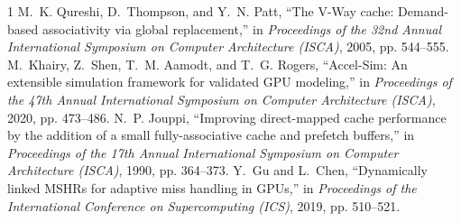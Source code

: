 \documentclass[conference,letterpaper]{IEEEtran}
\begin{document}
\begin{thebibliography}{1}
M.~K. Qureshi, D.~Thompson, and Y.~N. Patt, ``The {V-Way} cache: Demand-based associativity via global replacement,'' in \emph{Proceedings of the 32nd Annual International Symposium on Computer Architecture (ISCA)}, 2005, pp. 544--555.
M.~Khairy, Z.~Shen, T.~M. Aamodt, and T.~G. Rogers, ``{Accel-Sim}: An extensible simulation framework for validated {GPU} modeling,'' in \emph{Proceedings of the 47th Annual International Symposium on Computer Architecture (ISCA)}, 2020, pp. 473--486.
N.~P. Jouppi, ``Improving direct-mapped cache performance by the addition of a small fully-associative cache and prefetch buffers,'' in \emph{Proceedings of the 17th Annual International Symposium on Computer Architecture (ISCA)}, 1990, pp. 364--373.
Y.~Gu and L.~Chen, ``Dynamically linked {MSHRs} for adaptive miss handling in {GPUs},'' in \emph{Proceedings of the International Conference on Supercomputing (ICS)}, 2019, pp. 510--521.
\end{thebibliography}
\end{document}

